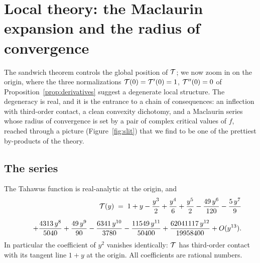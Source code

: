 \section{Local theory: the Maclaurin expansion and the radius of
convergence}\label{sec:maclaurin}

The sandwich theorem controls the global position of $\mathcal{T}$; we now zoom
in on the origin, where the three normalizations
$\mathcal{T}(0) = \mathcal{T}'(0) = 1$, $\mathcal{T}''(0) = 0$ of
Proposition~\ref{prop:derivatives} suggest a degenerate local structure.
The degeneracy is real, and it is the entrance to a chain of
consequences: an inflection with third-order contact, a clean
convexity dichotomy, and a Maclaurin series whose radius of convergence
is set by a pair of complex critical values of $f$, reached through a
picture (Figure~\ref{fig:slit}) that we find to be one of the prettiest
by-products of the theory.

\subsection{The series}

\begin{theorem}
\label{thm:maclaurin}
The Tahawus function is real-analytic at the origin, and
\begin{equation}\label{eq:maclaurin}
\begin{split}
    \mathcal{T}(y) \;=\; 1 + y - \frac{y^{3}}{2} + \frac{y^{4}}{6} +
    \frac{y^{5}}{2} - \frac{49\,y^{6}}{120} - \frac{5\,y^{7}}{9} \\[2mm]
    \qquad + \frac{4313\,y^{8}}{5040} + \frac{49\,y^{9}}{90} -
    \frac{6341\,y^{10}}{3780} - \frac{11549\,y^{11}}{50400} +
    \frac{62041117\,y^{12}}{19958400} + O(y^{13}) .
\end{split}
\end{equation}
In particular the coefficient of $y^{2}$ vanishes identically: $\mathcal{T}$
has third-order contact with its tangent line $1+y$ at the origin.
All coefficients are rational numbers.
\end{theorem}

